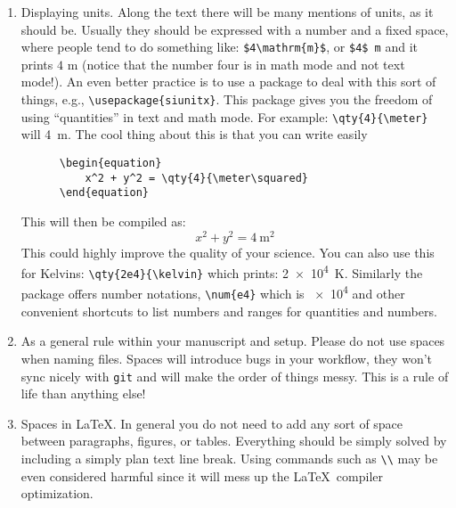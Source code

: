 \begin{enumerate}
  \item Displaying units. Along the text there will be many mentions of units, as it should be. Usually they should be expressed with a number and a fixed space, where people tend to do something like: \verb|$4\mathrm{m}$|, or \verb|$4$ m| and it prints $4$ m (notice that the number four is in math mode and not text mode!). An even better practice is to use a package to deal with this sort of things, e.g., \verb|\usepackage{siunitx}|. This package gives you the freedom of using ``quantities'' in text and math mode. For example: \verb|\qty{4}{\meter}| will \qty{4}{\m}. The cool thing about this is that you can write easily
  \begin{verbatim}
      \begin{equation}
          x^2 + y^2 = \qty{4}{\meter\squared}
      \end{equation}
  \end{verbatim}

  This will then be compiled as:
  \begin{equation}
    x^2 + y^2 = \qty{4}{\meter\squared}
  \end{equation}
  This could highly improve the quality of your science. You can also use this for Kelvins: \verb|\qty{2e4}{\kelvin}| which prints: \qty{2e4}{\kelvin}. Similarly the package offers number notations, \verb|\num{e4}| which is \num{e4} and other convenient shortcuts to list numbers and ranges for quantities and numbers. 


  \item As a general rule within your manuscript and setup. Please do not use spaces when naming files. Spaces will introduce bugs in your workflow, they won't sync nicely with \texttt{git} and will make the order of things messy. This is a rule of life than anything else!
  
  \item Spaces in \LaTeX. In general you do not need to add any sort of space between paragraphs, figures, or tables. Everything should be simply solved by including a simply plan text line break. Using commands such as \verb|\\| may be even considered harmful since it will mess up the \LaTeX\ compiler optimization. 
  
  
\end{enumerate}



